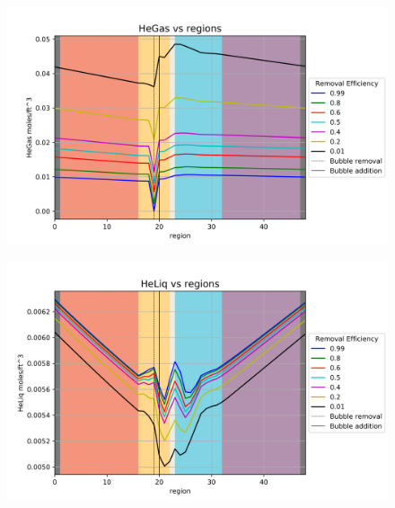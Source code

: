 \begin{figure}[p] 
\centering
\begin{minipage}{.5\textwidth}
  \centering
  \includegraphics[width=1.0\linewidth]{images/EffHeGas.png}
  \label{fig:EffHeGas}
\end{minipage}%
\begin{minipage}{.5\textwidth}
  \centering
  \includegraphics[width=1.0\linewidth]{images/EffHeLiq.png}
  \label{fig:EffHeLiq}
\end{minipage}
\end{figure}

